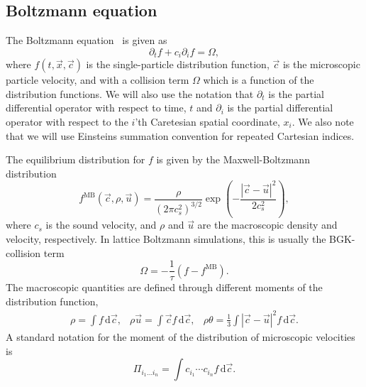 \documentclass[11pt,a4paper]{report}
\begin{document}
\subsection{Boltzmann equation}
\label{sec:boltzmann equation}
The Boltzmann equation~\cite{chapman_mathematical_1990} is given as
\begin{equation}
\partial_tf + c_i\partial_if = \Omega,
\end{equation}
where $f(t, \vec{x},\vec{c})$ is the single-particle distribution function, $\vec{c}$ is the microscopic particle velocity, and with a collision term $\Omega$ which is a function of the distribution functions. We will also use the notation that $\partial_t$ is the partial differential operator with respect to time, $t$ and $\partial_i$ is the partial differential operator with respect to the $i$'th Caretesian spatial coordinate, $x_i$. We also note that we will use Einsteins summation convention for repeated Cartesian indices.

The  equilibrium distribution for $f$ is given by the Maxwell-Boltzmann distribution
\begin{equation}
f^\mathrm{MB}(\vec{ c},\rho,\vec{u}) = \frac{\rho}{(2\pi c_s^2)^{3/2}}\exp\left(-\frac{|\vec{ c}-\vec{u}|^2}{2c_s^2}\right),
\end{equation}
where $c_s$ is the sound velocity, and $\rho$ and $\vec{u}$ are the macroscopic density and velocity, respectively. In lattice Boltzmann simulations, this is usually the BGK-collision term~\cite{bhatnagar_model_1954}
\begin{equation}
\Omega = -\frac{1}{\tau}\left(f-f^\mathrm{MB}\right).
\end{equation}
The macroscopic quantities are defined through different moments of the distribution function,
\begin{equation}
\begin{array}{lll}
\rho = \int f\,\mathrm{d}\vec{ c}, & \rho\vec{u} = \int \vec{ c} f\,\mathrm{d}\vec{ c}, & \rho\theta = \frac{1}{3}\int |\vec{ c}-\vec{u}|^2 f\,\mathrm{d}\vec{ c}.
\end{array}
\end{equation}
A standard notation for the moment of the distribution of microscopic velocities is 
\begin{equation}
\Pi_{i_1\dots i_n} = \int  c_{i_1}\cdots c_{i_n}f\,\mathrm{d}\vec{ c}.
\end{equation}
\end{document}
